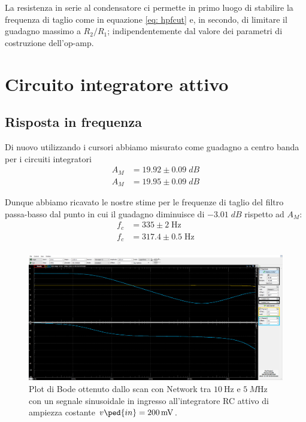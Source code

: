\documentclass[10pt,a4paper]{article}
\begin{document}
La resistenza in serie al condensatore ci permette in primo luogo di
stabilire la frequenza di taglio come in equazione \eqref{eq: hpfcut} e,
in secondo, di limitare il guadagno massimo a $R_2/R_1$;
indipendentemente dal valore dei parametri di costruzione dell'op-amp.

\section{Circuito integratore attivo}
\subsection{Risposta in frequenza}
Di nuovo utilizzando i cursori abbiamo misurato come guadagno a centro banda
per i circuiti integratori
\begin{align*}
A_M &= 19.92 \pm 0.09 \; \si{dB} \\
A_M &= 19.95 \pm 0.09 \; \si{dB}
\end{align*}

Dunque abbiamo ricavato le nostre stime per le frequenze di taglio del filtro
passa-basso dal punto in cui il guadagno diminuisce di $-3.01 \; \si{dB}$
rispetto ad $A_M$:
\begin{align*}
f_c &= 335 \pm 2 \; \si{\Hz} \\
f_c &= 317.4 \pm 0.5 \; \si{\Hz} \\
\end{align*}

\begin{figure}[htbp]
\centering
\includegraphics[scale=0.335]{lpfbode}
\caption{Plot di Bode ottenuto dallo scan con Network tra $\SI{10}{\Hz}$ e
$\SI{5}{M\Hz}$ con un segnale sinusoidale in ingresso all'integratore RC
attivo di ampiezza costante $v\ped{in} = \SI{200}{m\V}$.
\label{fig: intbode}}
\end{figure}
\end{document}
